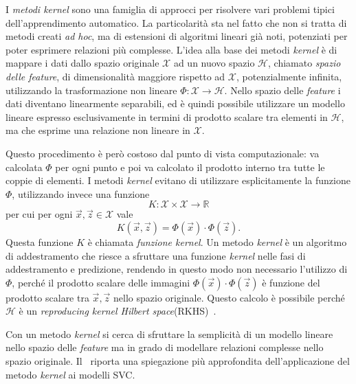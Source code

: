 I \emph{metodi kernel}\cite{2007_kernel_methods} sono una famiglia di approcci per risolvere vari problemi tipici dell'apprendimento automatico. La particolarità sta nel fatto che non si tratta di metodi creati \emph{ad hoc}, ma di estensioni di algoritmi lineari già noti, potenziati per poter esprimere relazioni più complesse.
L'idea alla base dei metodi \emph{kernel} è di mappare i dati dallo spazio originale $\mathcal{X}$ ad un nuovo spazio $\mathcal{H}$, chiamato \emph{spazio delle feature}, di dimensionalità maggiore rispetto ad $\mathcal{X}$, potenzialmente infinita, utilizzando la trasformazione non lineare $\Phi: \mathcal{X} \rightarrow \mathcal{H}$.
Nello spazio delle \emph{feature} i dati diventano linearmente separabili, ed è quindi possibile utilizzare un modello lineare espresso esclusivamente in termini di prodotto scalare tra elementi in $\mathcal{H}$, ma che esprime una relazione non lineare in $\mathcal{X}$.

Questo procedimento è però costoso dal punto di vista computazionale: va calcolata $\Phi$ per ogni punto e poi va calcolato il prodotto interno tra tutte le coppie di elementi.
I metodi \emph{kernel} evitano di utilizzare esplicitamente la funzione $\Phi$, utilizzando invece una funzione
\begin{equation*}
    K: \mathcal{X} \times \mathcal{X} \rightarrow \mathbb{R} 
\end{equation*}
per cui per ogni $\Vec{x}, \Vec{z} \in \mathcal{X}$ vale
\begin{equation*}
    K(\Vec{x}, \Vec{z}) = \Phi(\Vec{x}) \cdot \Phi(\Vec{z}).
\end{equation*}
Questa funzione $K$ è chiamata \emph{funzione kernel}.
Un metodo \emph{kernel} è un algoritmo di addestramento che riesce a sfruttare una funzione \emph{kernel} nelle fasi di addestramento e predizione, rendendo in questo modo non necessario l'utilizzo di $\Phi$, perché il prodotto scalare delle immagini $\Phi(\Vec{x}) \cdot \Phi(\Vec{z})$ è funzione del prodotto scalare tra $\Vec{x}, \Vec{z}$ nello spazio originale.
Questo calcolo è possibile perché $\mathcal{H}$ è un \emph{reproducing kernel Hilbert space}(RKHS)~\cite{RKHS}.

Con un metodo \emph{kernel} si cerca di sfruttare la semplicità di un modello lineare nello spazio delle \emph{feature} ma in grado di modellare relazioni complesse nello spazio originale.
Il~ riporta una spiegazione più approfondita dell'applicazione del metodo \emph{kernel} ai modelli SVC.

